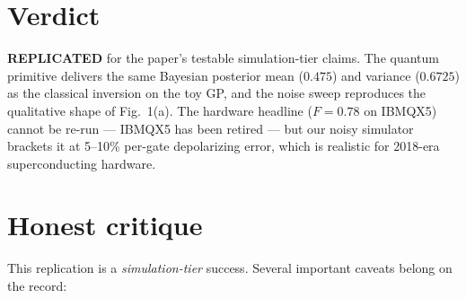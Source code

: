 \documentclass[11pt]{article}
\begin{document}
\section{Verdict}

\textbf{REPLICATED} for the paper's testable simulation-tier claims.
The quantum primitive delivers the same Bayesian posterior mean
($0.475$) and variance ($0.6725$) as the classical inversion on the
toy GP, and the noise sweep reproduces the qualitative shape of
Fig.~1(a). The hardware headline ($F=0.78$ on IBMQX5) cannot be
re-run --- IBMQX5 has been retired --- but our noisy simulator
brackets it at 5--10\% per-gate depolarizing error, which is
realistic for 2018-era superconducting hardware.

\section{Honest critique}

This replication is a \emph{simulation-tier} success. Several important
caveats belong on the record:
\end{document}
